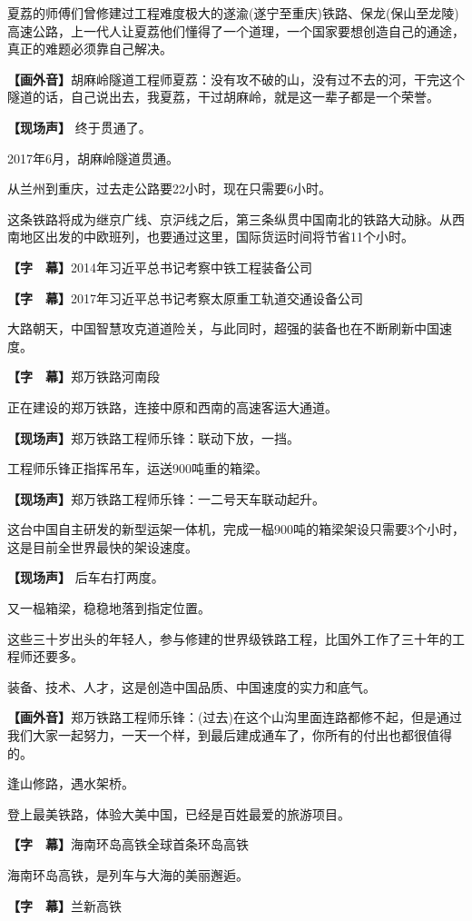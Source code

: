 \documentclass{ctexart}
\newcommand{\zkh}[1]{\textbf{\hspace{-2.7em} 【#1】}}
\begin{document}
夏荔的师傅们曾修建过工程难度极大的遂渝(遂宁至重庆)铁路、保龙(保山至龙陵)高速公路，上一代人让夏荔他们懂得了一个道理，一个国家要想创造自己的通途，真正的难题必须靠自己解决。

\zkh{画外音}胡麻岭隧道工程师夏荔：没有攻不破的山，没有过不去的河，干完这个隧道的话，自己说出去，我夏荔，干过胡麻岭，就是这一辈子都是一个荣誉。

 \zkh{现场声} 终于贯通了。

 2017年6月，胡麻岭隧道贯通。

 从兰州到重庆，过去走公路要22小时，现在只需要6小时。

这条铁路将成为继京广线、京沪线之后，第三条纵贯中国南北的铁路大动脉。从西南地区出发的中欧班列，也要通过这里，国际货运时间将节省11个小时。

 \zkh{字　幕}2014年习近平总书记考察中铁工程装备公司

 \zkh{字　幕}2017年习近平总书记考察太原重工轨道交通设备公司

 
大路朝天，中国智慧攻克道道险关，与此同时，超强的装备也在不断刷新中国速度。

 \zkh{字　幕}郑万铁路河南段

 正在建设的郑万铁路，连接中原和西南的高速客运大通道。

 \zkh{现场声}郑万铁路工程师乐锋：联动下放，一挡。

 工程师乐锋正指挥吊车，运送900吨重的箱梁。

 \zkh{现场声}郑万铁路工程师乐锋：一二号天车联动起升。

 
这台中国自主研发的新型运架一体机，完成一榀900吨的箱梁架设只需要3个小时，这是目前全世界最快的架设速度。

 \zkh{现场声} 后车右打两度。

 又一榀箱梁，稳稳地落到指定位置。

这些三十岁出头的年轻人，参与修建的世界级铁路工程，比国外工作了三十年的工程师还要多。

 装备、技术、人才，这是创造中国品质、中国速度的实力和底气。

\zkh{画外音}郑万铁路工程师乐锋：(过去)在这个山沟里面连路都修不起，但是通过我们大家一起努力，一天一个样，到最后建成通车了，你所有的付出也都很值得的。

 逢山修路，遇水架桥。

 登上最美铁路，体验大美中国，已经是百姓最爱的旅游项目。

 \zkh{字　幕}海南环岛高铁全球首条环岛高铁

 海南环岛高铁，是列车与大海的美丽邂逅。

 \zkh{字　幕}兰新高铁
\end{document}
